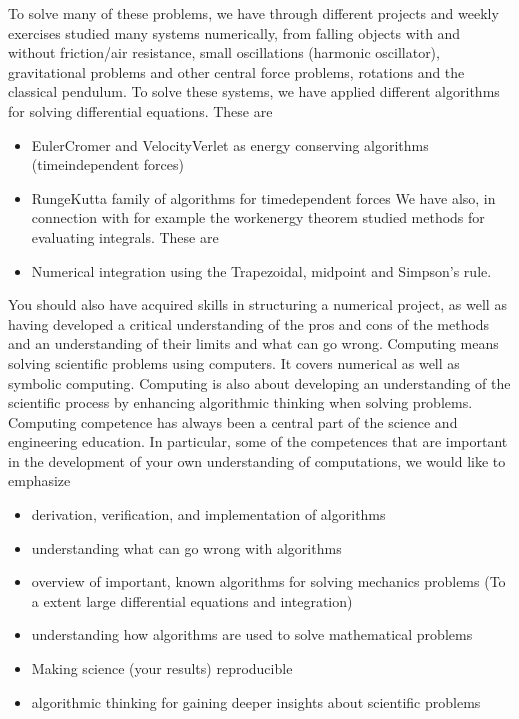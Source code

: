 \documentclass[letterpaper,10pt,english]{sphinxmanual}
\begin{document}
To solve many of these problems, we have through different projects and weekly exercises studied many systems numerically, from falling objects with and without friction/air resistance, small oscillations (harmonic oscillator), gravitational problems and other central force problems, rotations and the classical pendulum. To solve these systems, we have applied different algorithms for solving differential equations. These are
\begin{itemize}
\item {} 
Euler\sphinxhyphen{}Cromer and Velocity\sphinxhyphen{}Verlet as energy conserving algorithms (time\sphinxhyphen{}independent forces)

\item {} 
Runge\sphinxhyphen{}Kutta family of algorithms for time\sphinxhyphen{}dependent forces
We have also, in connection with for example the work\sphinxhyphen{}energy theorem studied methods for evaluating integrals. These are

\item {} 
Numerical integration using the Trapezoidal, midpoint and Simpson’s rule.

\end{itemize}

You should also have acquired skills in structuring a numerical project, as well as having developed a critical understanding of the pros and cons of the methods and an understanding of their limits and what can go wrong.  Computing means solving scientific problems using computers. It covers numerical as well as symbolic computing. Computing is also about developing an understanding of the scientific process by enhancing algorithmic thinking when solving problems.  Computing competence has
always been a central part of the science and engineering education.
In particular, some of the competences that are important in the development of your own understanding of
computations, we would like to emphasize
\begin{itemize}
\item {} 
derivation, verification, and implementation of algorithms

\item {} 
understanding what can go wrong with algorithms

\item {} 
overview of important, known algorithms for solving mechanics problems (To a extent large differential equations and integration)

\item {} 
understanding how algorithms are used to solve mathematical problems

\item {} 
Making science (your results) reproducible

\item {} 
algorithmic thinking for gaining deeper insights about scientific problems

\end{itemize}
\end{document}
